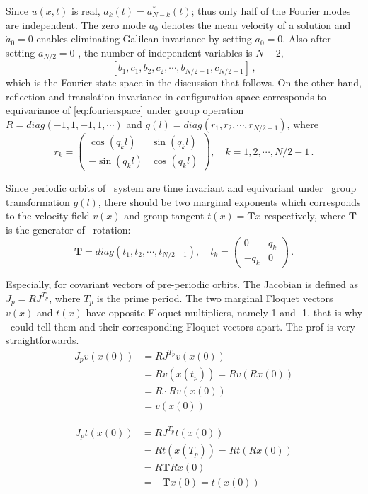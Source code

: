 Since $u(x,t)$ is real, $a_{k}(t)=a^{*}_{N-k}(t)$; thus only half of the
Fourier modes are independent. The zero mode $a_{0}$ denotes the
mean velocity of a solution and $\dot{a}_{0}=0$
 enables eliminating Galilean invariance by
setting $a_{0}=0$.
Also after setting $a_{N/2}=0$ \cite{SCD07}, the number of independent variables is $N-2$,
\begin{equation}
\label{eq:fourierspace}
[b_{1},c_{1},b_{2},c_{2},\cdots,b_{N/2-1},c_{N/2-1}]
\,,
\end{equation}
which is the Fourier state space in the discussion that follows.
On the other hand, reflection and translation invariance in
configuration space corresponds to  equivariance of
 \eqref{eq:fourierspace} under group operation
 $R=diag(-1,1,-1,1,\cdots)$ and  $g(l)=diag(r_{1},r_{2},\cdots,r_{N/2-1})$,
where
\[
r_{k}=
\begin{pmatrix}
  \cos(q_{k}l) & \sin(q_{k}l) \\
  -\sin(q_{k}l) & \cos(q_{k}l)
\end{pmatrix}
,\quad k=1,2,\cdots,N/2-1
\,.
\]

 Since periodic orbits of \KS\ system
are time invariant and equivariant under \ group transformation
 $g(l)$, there should be two marginal exponents which corresponds
to the velocity field $v(x)$ and group tangent $t(x)=\mathbf{T}x$
respectively, where
$\mathbf{T}$ is the generator of \ rotation:
\[
\mathbf{T}=diag(t_{1},t_{2},\cdots,t_{N/2-1}),\quad
t_{k}=
\begin{pmatrix}
  0 & q_{k} \\
  -q_{k} & 0
\end{pmatrix}
\,.
\]

Especially, for covariant vectors of pre-periodic orbits.
The Jacobian is defined as $J_{p}=RJ^{T_{p}}$, where $T_{p}$ is the prime
period. The two marginal Floquet vectors $v(x)$ and $t(x)$ have
opposite  Floquet multipliers, namely 1 and -1, that is why \ped\ could tell
them and their corresponding Floquet vectors apart. The prof is very
straightforwards.
\begin{align*}
  J_{p}v(x(0))& = RJ^{T_{p}}v(x(0)) \\
  & = Rv(x(t_{p})) =Rv(Rx(0)) \\
  & =R\cdot R v(x(0)) \\
  & =v(x(0))
\end{align*}

\begin{align*}
  J_{p}t(x(0))&= RJ^{T_{p}}t(x(0)) \\
  & = Rt(x(T_{p})) =Rt(Rx(0)) \\
  & = R\mathbf{T}Rx(0) \\
  & = -\mathbf{T}x(0)=t(x(0))\\
\end{align*}

